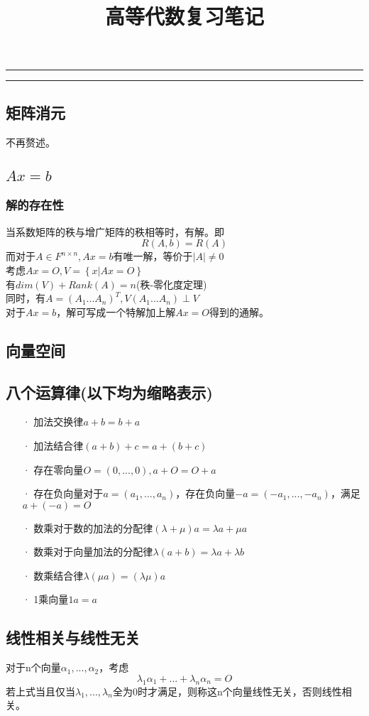 \documentclass[UTF8]{ctexart}
\title{高等代数复习笔记}
\date{}
\begin{document}
\maketitle
\pagestyle{plain}
\hrule
\tableofcontents
\hrule
\subsection{矩阵消元}不再赘述。
\subsection{$Ax=b$}
\subsubsection{解的存在性}
当系数矩阵的秩与增广矩阵的秩相等时，有解。即
\[\displaystyle R(A,b)=R(A) \]
\indent
而对于$A\in F^{n\times n},Ax=b$有唯一解，等价于$|A|\neq 0$\\
\indent
考虑$Ax=\mathit{O},V=\left\{{x|Ax=\mathit{O}}\right\}$\\
\indent
有$dim(V)+Rank(A)=n$(秩-零化度定理)\\
\indent
同时，有$A=(A_1...A_n)^T,V(A_1...A_n)\perp V$\\
\indent
对于$Ax=b$，解可写成一个特解加上解$Ax=\mathit{O}$得到的通解。
\subsection{向量空间}
\subsection{八个运算律(以下均为缩略表示)}
\begin{itemize}
	\item [·]加法交换律$a+b=b+a$
	\item [·]加法结合律$(a+b)+c=a+(b+c)$
	\item [·]存在零向量$\mathit{O}=(0,...,0),a+\mathit{O}=\mathit{O}+a$
	\item [·]存在负向量对于$a=(a_1,...,a_n)$，存在负向量$-a=(-a_1,...,-a_n)$，满足$a+(-a)=\mathit{O}$
	\item [·]数乘对于数的加法的分配律$(\lambda+\mu)a=\lambda a+\mu a$
	\item [·]数乘对于向量加法的分配律$\lambda(a+b)=\lambda a+\lambda b$
	\item [·]数乘结合律$\lambda(\mu a)=(\lambda \mu)a$
	\item [·]1乘向量$1a=a$
\end{itemize}
\subsection{线性相关与线性无关}
对于n个向量$\alpha_1,...,\alpha_2$，考虑
\[\displaystyle \lambda_1\alpha_1+...+\lambda_n\alpha_n=\mathit{O}\]
\indent
若上式当且仅当$\lambda_1,...,\lambda_n$全为0时才满足，则称这n个向量线性无关，否则线性相关。
\end{document}
